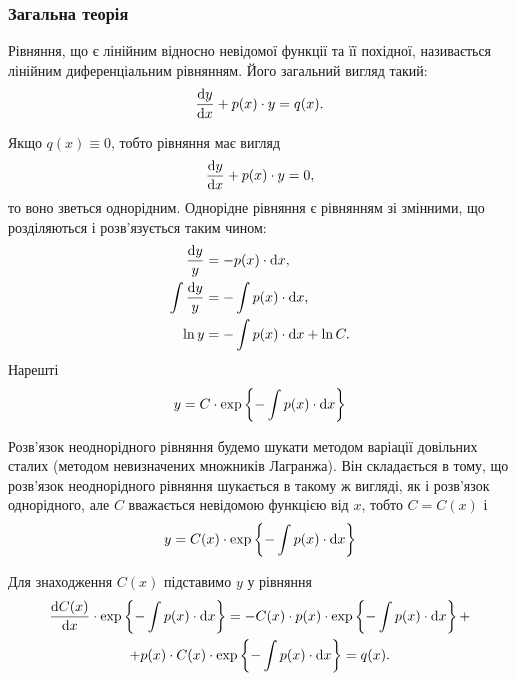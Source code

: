 \subsubsection{Загальна теорія}

Рівняння, що є лінійним відносно невідомої функції та її похідної, називається лінійним диференціальним рівнянням. Його загальний вигляд такий:
\begin{equation*}
	\frac{\mathop{}\!\mathrm{d} y}{\mathop{}\!\mathrm{d} x} + p(x) \cdot y = q(x).
\end{equation*}

Якщо $q(x) \equiv 0$, тобто рівняння має вигляд
\begin{equation*}
	\frac{\mathop{}\!\mathrm{d} y}{\mathop{}\!\mathrm{d} x} + p(x) \cdot y = 0,
\end{equation*}
то воно зветься однорідним. Однорідне рівняння є рівнянням зі змінними, що розділяються і розв’язується таким чином:
\begin{align*}
	\frac{\mathop{}\!\mathrm{d} y}{y} &= -p(x) \cdot \mathop{}\!\mathrm{d} x, \\
	\int \frac{\mathop{}\!\mathrm{d} y}{y} &= - \int p(x) \cdot \mathop{}\!\mathrm{d} x, \\
	\ln y &= - \int p(x) \cdot \mathop{}\!\mathrm{d} x + \ln C.
\end{align*}
Нарешті 
\begin{equation*}
	y = C \cdot \exp \left\{ - \int p(x) \cdot \mathop{}\!\mathrm{d} x \right\}
\end{equation*}

Розв’язок неоднорідного рівняння будемо шукати методом варіації довільних сталих (методом невизначених множників Лагранжа). Він складається в тому, що розв’язок неоднорідного рівняння шукається в такому ж вигляді, як і розв’язок однорідного, але $C$ вважається невідомою функцією від $x$, тобто $C = C(x)$ і 
\begin{equation*}
	y = C(x) \cdot \exp \left\{ - \int p(x) \cdot \mathop{}\!\mathrm{d} x \right\}	
\end{equation*}

Для знаходження $C(x)$ підставимо $y$ у рівняння
\begin{multline*} 
	\frac{\mathop{}\!\mathrm{d} C(x)}{\mathop{}\!\mathrm{d} x} \cdot \exp \left\{ - \int p(x) \cdot \mathop{}\!\mathrm{d} x \right\} = - C(x) \cdot p(x) \cdot \exp \left\{ - \int p(x) \cdot \mathop{}\!\mathrm{d} x \right\} + \\
	+ p(x) \cdot C(x) \cdot \exp \left\{ - \int p(x) \cdot \mathop{}\!\mathrm{d} x \right\} = q(x).
\end{multline*}

